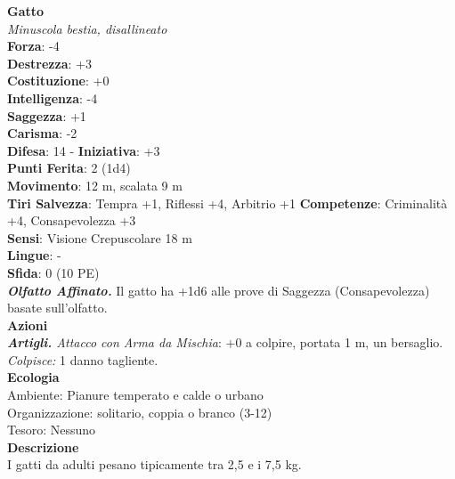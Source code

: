 \begin{multicols}{2}
\medskip\textbf{Gatto}\\
\emph{Minuscola bestia, disallineato}\\
\textbf{Forza}: -4\\
\textbf{Destrezza}: +3\\
\textbf{Costituzione}: +0\\
\textbf{Intelligenza}: -4\\
\textbf{Saggezza}: +1\\
\textbf{Carisma}: -2\\
\textbf{Difesa}: 14 - \textbf{Iniziativa}: +3\\
\textbf{Punti Ferita}: 2 (1d4)\\
\textbf{Movimento}: 12 m, scalata 9 m\\
\textbf{Tiri Salvezza}:  Tempra +1, Riflessi +4, Arbitrio +1 
\textbf{Competenze}: Criminalità +4, Consapevolezza +3\\
\textbf{Sensi}: Visione Crepuscolare 18 m\\
\textbf{Lingue}: -\\
\textbf{Sfida}: 0 (10 PE)\smallskip\\
\emph{\textbf{Olfatto Affinato.}} Il gatto ha +1d6 alle prove di Saggezza (Consapevolezza) basate sull'olfatto.\\
\smallskip\textbf{Azioni}\\
\emph{\textbf{Artigli.} Attacco con Arma da Mischia}: +0 a colpire, portata 1 m, un bersaglio.\\
\emph{Colpisce:} 1 danno tagliente.\\
\textbf{Ecologia}\\
Ambiente: Pianure temperato e calde o urbano\\
Organizzazione: solitario, coppia o branco (3-12)\\
Tesoro: Nessuno\\
\textbf{Descrizione}\\
I gatti da adulti pesano tipicamente tra 2,5 e i 7,5 kg. \\


\end{multicols}
